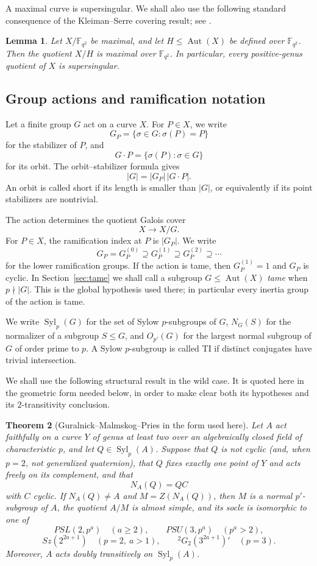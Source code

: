 \documentclass[10pt,a4paper]{amsart}
\newtheorem{theorem}{Theorem}[section]
\newtheorem{lemma}[theorem]{Lemma}
\newcommand{\F}{\mathbb F}
\newcommand{\Aut}{\operatorname{Aut}}
\newcommand{\Syl}{\operatorname{Syl}}
\begin{document}
A maximal curve is supersingular.  We shall also use the following
standard consequence of the Kleiman--Serre covering result; see
\cite[Proposition~6]{Lachaud}.

\begin{lemma}\label{lem:quotientmax}
Let $X/\F_{q^2}$ be maximal, and let $H\leq\Aut(X)$ be defined over
$\F_{q^2}$.  Then the quotient $X/H$ is maximal over $\F_{q^2}$.
In particular, every positive-genus quotient of $X$ is supersingular.
\end{lemma}

\subsection{Group actions and ramification notation}

Let a finite group $G$ act on a curve $X$.  For $P\in X$, we write
\[
        G_P=\{\sigma\in G:\sigma(P)=P\}
\]
for the stabilizer of $P$, and
\[
        G\cdot P=\{\sigma(P):\sigma\in G\}
\]
for its orbit.  The orbit--stabilizer formula gives
\[
        |G|=|G_P|\,|G\cdot P|.
\]
An orbit is called short if its length is smaller than $|G|$, or
equivalently if its point stabilizers are nontrivial.

The action determines the quotient Galois cover
\[
        X\longrightarrow X/G.
\]
For $P\in X$, the ramification index at $P$ is $|G_P|$.  We write
\[
        G_P=G_P^{(0)}\supseteq G_P^{(1)}
             \supseteq G_P^{(2)}\supseteq\cdots
\]
for the lower ramification groups.  If the action is tame, then
$G_P^{(1)}=1$ and $G_P$ is cyclic.  In Section~\ref{sec:tame} we shall
call a subgroup $G\le\Aut(X)$ \emph{tame} when $p\nmid|G|$.  This is
the global hypothesis used there; in particular every inertia group of
the action is tame.

We write $\Syl_p(G)$ for the set of Sylow $p$-subgroups of $G$,
$N_G(S)$ for the normalizer of a subgroup $S\le G$, and
$O_{p'}(G)$ for the largest normal subgroup of $G$ of order prime to
$p$.  A Sylow $p$-subgroup is called TI if distinct conjugates have
trivial intersection.

We shall use the following structural result in the wild case. It is
quoted here in the geometric form needed below, in order to make clear
both its hypotheses and its $2$-transitivity conclusion.


\begin{theorem}[Guralnick--Malmskog--Pries in the form used here]\label{thm:GMP-TI}
Let $A$ act faithfully on a curve $Y$ of genus at least two over an
algebraically closed field of characteristic $p$, and let
$Q\in\Syl_p(A)$. Suppose that $Q$ is not cyclic (and, when $p=2$, not
generalized quaternion), that $Q$ fixes exactly one point of $Y$ and
acts freely on its complement, and that
\[
        N_A(Q)=QC
\]
with $C$ cyclic. If $N_A(Q)\ne A$ and $M=Z(N_A(Q))$, then $M$ is a
normal $p'$-subgroup of $A$, the quotient $A/M$ is almost simple, and
its socle is isomorphic to one of
\[
 PSL(2,p^a)\quad(a\ge2),\qquad
 PSU(3,p^a)\quad(p^a>2),
\]
\[
 Sz(2^{2a+1})\quad(p=2,\ a>1),\qquad
 {}^2G_2(3^{2a+1})'\quad(p=3).
\]
Moreover, $A$ acts doubly transitively on $\Syl_p(A)$.
\end{theorem}
\end{document}
